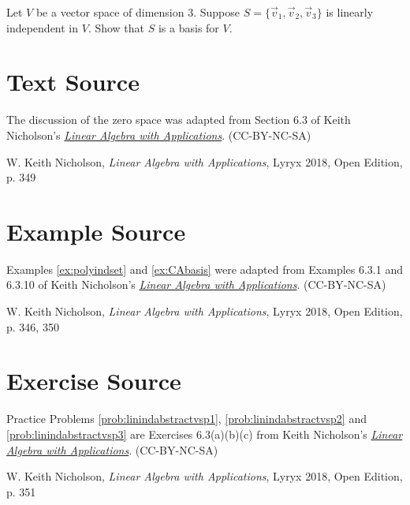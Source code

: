 \documentclass{ximera}
\begin{document}
\begin{problem}\label{prob:basisforabstractvectspace}
Let $V$ be a vector space of dimension $3$.  Suppose $S=\{\vec{v}_1, \vec{v}_2, \vec{v}_3\}$ is linearly independent in $V$.  Show that $S$ is a basis for $V$.
\end{problem}

\section*{Text Source} The discussion of the zero space was adapted from Section 6.3 of Keith Nicholson's \href{https://open.umn.edu/opentextbooks/textbooks/linear-algebra-with-applications}{\it Linear Algebra with Applications}. (CC-BY-NC-SA)

W. Keith Nicholson, {\it Linear Algebra with Applications}, Lyryx 2018, Open Edition, p. 349 

\section*{Example Source}
Examples \ref{ex:polyindset} and \ref{ex:CAbasis} were adapted from Examples 6.3.1 and 6.3.10 of Keith Nicholson's \href{https://open.umn.edu/opentextbooks/textbooks/linear-algebra-with-applications}{\it Linear Algebra with Applications}. (CC-BY-NC-SA)

W. Keith Nicholson, {\it Linear Algebra with Applications}, Lyryx 2018, Open Edition, p. 346, 350

\section*{Exercise Source}
Practice Problems \ref{prob:linindabstractvsp1}, \ref{prob:linindabstractvsp2} and \ref{prob:linindabstractvsp3} are Exercises 6.3(a)(b)(c) from Keith Nicholson's \href{https://open.umn.edu/opentextbooks/textbooks/linear-algebra-with-applications}{\it Linear Algebra with Applications}. (CC-BY-NC-SA)

W. Keith Nicholson, {\it Linear Algebra with Applications}, Lyryx 2018, Open Edition, p. 351
\end{document}
